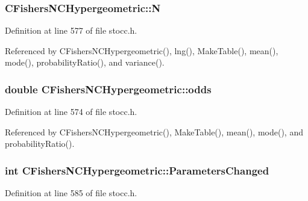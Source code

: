\subsubsection[{N}]{ C\-Fishers\-N\-C\-Hypergeometric\-::\-N\hspace{0.3cm}{\ttfamily [protected]}}\label{class_c_fishers_n_c_hypergeometric_a49af84d35ac4cc8d41e70e54ecb209fc}


Definition at line 577 of file stocc.\-h.



Referenced by C\-Fishers\-N\-C\-Hypergeometric(), lng(), Make\-Table(), mean(), mode(), probability\-Ratio(), and variance().

\subsubsection[{odds}]{\setlength{\rightskip}{0pt plus 5cm}double C\-Fishers\-N\-C\-Hypergeometric\-::odds\hspace{0.3cm}{\ttfamily [protected]}}\label{class_c_fishers_n_c_hypergeometric_a7e3bd41016c9f4368d8cee1481e0ffe9}


Definition at line 574 of file stocc.\-h.



Referenced by C\-Fishers\-N\-C\-Hypergeometric(), Make\-Table(), mean(), mode(), and probability\-Ratio().

\subsubsection[{Parameters\-Changed}]{\setlength{\rightskip}{0pt plus 5cm}int C\-Fishers\-N\-C\-Hypergeometric\-::\-Parameters\-Changed\hspace{0.3cm}{\ttfamily [protected]}}\label{class_c_fishers_n_c_hypergeometric_a91fefae1dc0d1b58df24faca406d71b0}


Definition at line 585 of file stocc.\-h.



